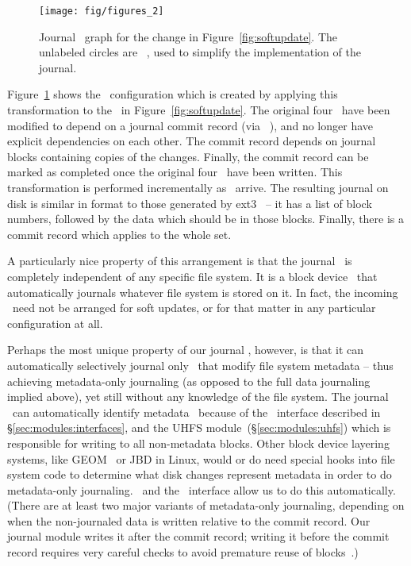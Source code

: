 \begin{figure}
  \centering
  \texttt{[image: fig/figures\_2]}
  \caption{\label{fig:journal} Journal \chdesc\ graph for the
    change in Figure~\ref{fig:softupdate}. The unlabeled circles are
    \noop\ \chdescs, used to simplify the implementation of the journal.}
\end{figure}

Figure~\ref{fig:journal} shows the \chdesc\ configuration which is created by
applying this transformation to the \chdescs\ in Figure~\ref{fig:softupdate}.
The original four \chdescs\ have been modified to depend on a journal commit
record (via \anoop\ \chdesc), and no longer have explicit dependencies on each
other. The commit record depends on journal blocks containing copies of the
changes. Finally, the commit record can be marked as completed once the
original four \chdescs\ have been written. This transformation is performed
incrementally as \chdescs\ arrive. The resulting journal on disk is similar in
format to those generated by ext3~\cite{tweedie98journaling} -- it has a list of
block numbers, followed by the data which should be in those blocks. Finally,
there is a commit record which applies to the whole set.

A particularly nice property of this arrangement is that the journal \module\ is
completely independent of any specific file system. It is a block device
\module\ that automatically journals whatever file system is stored on it. In
fact, the incoming \chdescs\ need not be arranged for soft updates, or for that
matter in any particular configuration at all.

Perhaps the most unique property of our journal \module, however, is that it can
automatically selectively journal only \chdescs\ that modify file system
metadata -- thus achieving metadata-only journaling (as opposed to the full data
journaling implied above), yet still without any knowledge of the file system.
%
The journal \module\ can automatically identify metadata \chdescs\ because of
the \LFS\ interface described in \S\ref{sec:modules:interfaces}, and the UHFS
module~(\S\ref{sec:modules:uhfs}) which is responsible for writing to all
non-metadata blocks. Other block device layering systems, like GEOM~\cite{geom}
or JBD in Linux, would or do need special hooks into file system code to
determine what disk changes represent metadata in order to do metadata-only
journaling. \Chdescs\ and the \LFS\ interface allow us to do this automatically.
%
(There are at least two major variants of metadata-only journaling, depending on
when the non-journaled data is written relative to the commit record. Our
journal module writes it after the commit record; writing it before the commit
record requires very careful checks to avoid premature reuse of
blocks~\cite{tweedie00ext3}.)

